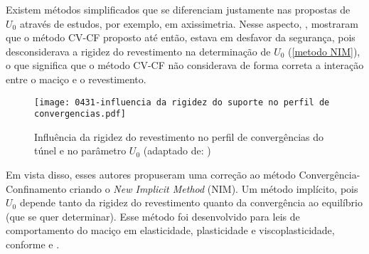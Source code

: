 Existem métodos simplificados que se diferenciam justamente nas propostas de $U_0$ através de estudos, por exemplo, em axissimetria. Nesse aspecto, , mostraram que o método CV-CF proposto até então, estava em desfavor da segurança, pois desconsiderava a rigidez do revestimento na determinação de $U_0$   (\autoref{metodo NIM}), o que significa que o método CV-CF não considerava de forma correta a interação entre o maciço e o revestimento.

\begin{figure}[H]
	\begin{center}
		\texttt{[image: 0431-influencia da rigidez do suporte no perfil de convergencias.pdf]}
	\end{center}
	\caption{\label{metodo NIM}Influência da rigidez do revestimento no perfil de convergências do túnel e no parâmetro $U_0$ (adaptado de: )}
\end{figure}

Em vista disso, esses autores propuseram uma correção ao método Convergência-Confinamento criando o \textit{New Implicit Method} (NIM). Um método implícito, pois $U_0$ depende tanto da rigidez do revestimento quanto da convergência ao equilíbrio (que se quer determinar). Esse método foi desenvolvido para leis de comportamento do maciço em elasticidade, plasticidade e viscoplasticidade, conforme  e .
